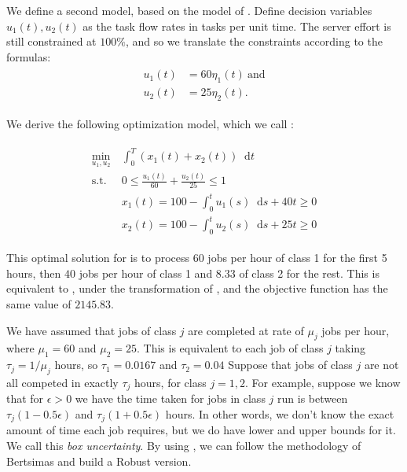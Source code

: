 \documentclass[11pt,a4paper,titlepage]{article}
\newcommand*{\dd}{\ensuremath{\mathop{}\!\mathrm{d}}}%
\theoremstyle{definition}
\theoremstyle{plain}
\begin{document}
We define a second model,
based on the model of \autocite{bertsimas2014robust}.
Define  decision variables $u_1(t), u_2(t)$ as the task flow rates
in tasks per unit time.
The server effort is still constrained at $100\%$,
and so we translate the constraints according to the formulas:
\begin{align}
\label{eq:model-2-translation}
\begin{split}
    u_1(t) & = 60 \eta_1(t) ~ \text{and} \\
    u_2(t) & = 25 \eta_2(t).
\end{split}
\end{align}

We derive the following optimization model,
which we call \modeltwo:

\begin{align}
\label{eq:model-2}
\begin{split}
    \min\limits_{u_1, u_2}
        &~ \int_0^T \left( x_1(t) + x_2(t) \right) \dd t \\
    \text{s.t.}
        &~ 0 \leq \frac{u_1(t)}{60} + \frac{u_2(t)}{25} \leq 1 \\
        &~ x_1(t) = 100 - \int_0^t u_1(s) \dd s + 40t \geq 0 \\
        &~ x_2(t) = 100 - \int_0^t u_2(s) \dd s + 25t \geq 0
\end{split}
\end{align}

This optimal solution for \modeltwo is to process $60$ jobs per hour of class 1
for the first 5 hours,
then $40$ jobs per hour of class 1 and $8.33$ of class 2 for the rest.
This is equivalent to \modelone,
under the transformation of ,
and the objective function has the same value of $2145.83$.

We have assumed that jobs of class $j$ are completed at rate of $\mu_j$ jobs per hour,
where $\mu_1=60$ and $\mu_2=25$.
This is equivalent to each job of class $j$ taking $\tau_j=1/\mu_j$ hours,
so $\tau_1=0.0167$ and $\tau_2 = 0.04$
Suppose that jobs of class $j$ are not all competed in exactly $\tau_j$ hours,
for class $j=1,2$.
For example,
suppose we know that for $\epsilon > 0$
we have the time taken for jobs in class $j$ run is between
$\tau_j (1 - 0.5 \epsilon)$
and
$\tau_j (1 + 0.5 \epsilon)$
hours.
In other words,
we don't know the exact amount of time each job requires,
but we do have lower and upper bounds for it.
We call this \textit{box uncertainty}.
By using \modeltwo,
we can follow the methodology of Bertsimas and build a Robust version.
\end{document}
